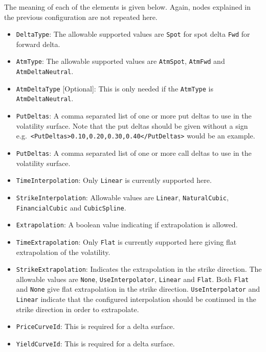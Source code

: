 The meaning of each of the elements is given below. Again, nodes explained in the previous configuration are not repeated here.
\begin{itemize}
\item \lstinline!DeltaType!:
The allowable supported values are \lstinline!Spot! for spot delta \lstinline!Fwd! for forward delta.

\item \lstinline!AtmType!:
The allowable supported values are \lstinline!AtmSpot!, \lstinline!AtmFwd! and \lstinline!AtmDeltaNeutral!.

\item \lstinline!AtmDeltaType! [Optional]:
This is only needed if the \lstinline!AtmType! is \lstinline!AtmDeltaNeutral!.

\item \lstinline!PutDeltas!:
A comma separated list of one or more put deltas to use in the volatility surface. Note that the put deltas should be given without a sign e.g.\ \lstinline!<PutDeltas>0.10,0.20,0.30,0.40</PutDeltas>! would be an example.

\item \lstinline!PutDeltas!:
A comma separated list of one or more call deltas to use in the volatility surface.

\item \lstinline!TimeInterpolation!:
Only \lstinline!Linear! is currently supported here.

\item \lstinline!StrikeInterpolation!:
Allowable values are \lstinline!Linear!, \lstinline!NaturalCubic!, \lstinline!FinancialCubic! and \lstinline!CubicSpline!.

\item \lstinline!Extrapolation!:
A boolean value indicating if extrapolation is allowed.

\item \lstinline!TimeExtrapolation!:
Only \lstinline!Flat! is currently supported here giving flat extrapolation of the volatility.

\item \lstinline!StrikeExtrapolation!:
Indicates the extrapolation in the strike direction. The allowable values are \lstinline!None!, \lstinline!UseInterpolator!, \lstinline!Linear! and \lstinline!Flat!. Both \lstinline!Flat! and \lstinline!None! give flat extrapolation in the strike direction. \lstinline!UseInterpolator! and \lstinline!Linear! indicate that the configured interpolation should be continued in the strike direction in order to extrapolate.

\item \lstinline!PriceCurveId!:
This is required for a delta surface.

\item \lstinline!YieldCurveId!:
This is required for a delta surface.

\end{itemize}

